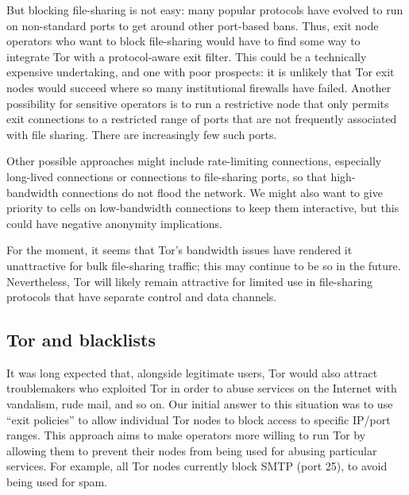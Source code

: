 \documentclass{llncs}
\begin{document}
But blocking file-sharing is not easy: many popular
protocols have evolved to run on non-standard ports to
get around other port-based bans.  Thus, exit node operators who want to
block file-sharing would have to find some way to integrate Tor with a
protocol-aware exit filter.  This could be a technically expensive
undertaking, and one with poor prospects: it is unlikely that Tor exit nodes
would succeed where so many institutional firewalls have failed.  Another
possibility for sensitive operators is to run a restrictive node that
only permits exit connections to a restricted range of ports that are
not frequently associated with file sharing.  There are increasingly few such
ports.

Other possible approaches might include rate-limiting connections, especially
long-lived connections or connections to file-sharing ports, so that
high-bandwidth connections do not flood the network.  We might also want to
give priority to cells on low-bandwidth connections to keep them interactive,
but this could have negative anonymity implications.

For the moment, it seems that Tor's bandwidth issues have rendered it
unattractive for bulk file-sharing traffic; this may continue to be so in the
future.  Nevertheless, Tor will likely remain attractive for limited use in
file-sharing protocols that have separate control and data channels.



\subsection{Tor and blacklists}
\label{subsec:tor-and-blacklists}

It was long expected that, alongside legitimate users, Tor would also
attract troublemakers who exploited Tor in order to abuse services on the
Internet with vandalism, rude mail, and so on.
Our initial answer to this situation was to use ``exit policies''
to allow individual Tor nodes to block access to specific IP/port ranges.
This approach aims to make operators more willing to run Tor by allowing
them to prevent their nodes from being used for abusing particular
services.  For example, all Tor nodes currently block SMTP (port 25),
to avoid being used for spam.
\end{document}
